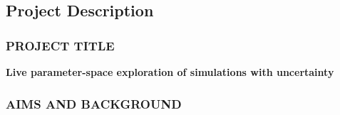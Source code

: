 \documentclass[a4paper,fontsize=12pt]{scrartcl}
\author{}
\date{\today}
\begin{document}
\renewcommand{\thesection}{\Alph{section}}

\setcounter{section}{3} %
\subsection{Project Description}
\label{sec:project-description}

\subsubsection*{PROJECT TITLE}

\textbf{Live parameter-space exploration of simulations with uncertainty} 





\subsubsection*{AIMS AND BACKGROUND}
\end{document}
